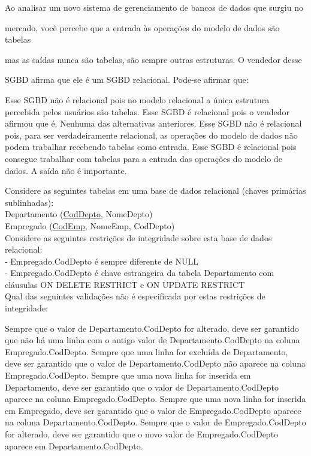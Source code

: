 \documentclass[12pt, addpoints]{exam}
\begin{document}
\begin{questions}
\question

Ao analisar um novo sistema de gerenciamento de bancos de dados que surgiu no

mercado, você percebe que a entrada às operações do modelo de dados são tabelas

mas as saídas nunca são tabelas, são sempre outras estruturas. O vendedor desse

SGBD afirma que ele é um SGBD relacional. Pode-se afirmar que:


\begin{choices}
\choice Esse SGBD não é relacional pois no modelo relacional a única estrutura percebida pelos usuários são tabelas.
\choice Esse SGBD é relacional pois o vendedor afirmou que é.
\choice Nenhuma das alternativas anteriores.
\choice Esse SGBD não é relacional pois, para ser verdadeiramente relacional, as operações do modelo de dados não podem trabalhar recebendo tabelas como entrada.
\choice Esse SGBD é relacional pois consegue trabalhar com tabelas para a entrada das operações do modelo de dados. A saída não é importante.
\end{choices}

\question

Considere as seguintes tabelas em uma base de dados relacional (chaves primárias sublinhadas):\\

Departamento (\underline{CodDepto}, NomeDepto)\\

Empregado (\underline{CodEmp}, NomeEmp, CodDepto)\\

Considere as seguintes restrições de integridade sobre esta base de dados relacional:\\

- Empregado.CodDepto é sempre diferente de NULL\\

- Empregado.CodDepto é chave estrangeira da tabela Departamento com cláusulas ON DELETE RESTRICT e ON UPDATE RESTRICT\\

Qual das seguintes validações não é especificada por estas restrições de integridade:
\begin{choices}
\choice Sempre que o valor de Departamento.CodDepto for alterado, deve ser garantido que não há uma linha com o antigo valor de Departamento.CodDepto na coluna Empregado.CodDepto.
\choice Sempre que uma linha for excluída de Departamento, deve ser garantido que o valor de Departamento.CodDepto não aparece na coluna Empregado.CodDepto.
\choice Sempre que uma nova linha for inserida em Departamento, deve ser garantido que o valor de Departamento.CodDepto aparece na coluna Empregado.CodDepto.
\choice Sempre que uma nova linha for inserida em Empregado, deve ser garantido que o valor de Empregado.CodDepto aparece na coluna Departamento.CodDepto.
\choice Sempre que o valor de Empregado.CodDepto for alterado, deve ser garantido que o novo valor de Empregado.CodDepto aparece em Departamento.CodDepto.
\end{choices}


\end{questions}
\end{document}
